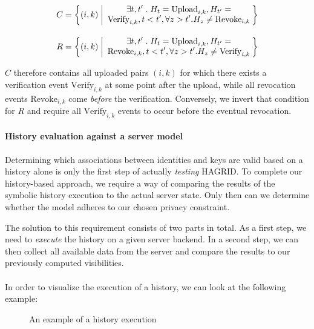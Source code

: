 \begin{equation}
    \label{eq:states}
    \begin{alignedat}{2}
        C &= \biggl \{(i,k) &&\;\bigg|\; \pctext{2.4in}{\(\exists t,t'\;.\; H_t = \text{Upload}_{i,k},H_{t'} = \text{Verify}_{i,k}, t < t', \forall z > t'. H_z \neq \text{Revoke}_{i,k}\)}  \biggr \} \\[10pt]
        R &= \biggl \{(i,k) &&\;\bigg|\; \pctext{2.4in}{\(\exists t,t'\;.\; H_t = \text{Upload}_{i,k},H_{t'} = \text{Revoke}_{i,k}, t < t', \forall z > t'. H_z \neq \text{Verify}_{i,k}\)}  \biggr \}
    \end{alignedat}
\end{equation}

\(C\) therefore contains all uploaded pairs \((i,k)\) for which there exists a verification event \(\text{Verify}_{i,k}\) at some point after the upload, while all revocation events \(\text{Revoke}_{i,k}\) come \emph{before} the verification. Conversely, we invert that condition for \(R\) and require all \(\text{Verify}_{i,k}\) events to occur before the eventual revocation.


\paragraph{History evaluation against a server model}
Determining which associations between identities and keys are valid based on a history alone is only the first step of actually \emph{testing} HAGRID. To complete our history-based approach, we require a way of comparing the results of the symbolic history execution to the actual server state. Only then can we determine whether the model adheres to our chosen privacy constraint.

The solution to this requirement consists of two parts in total. As a first step, we need to \emph{execute} the history on a given server backend. In a second step, we can then collect all available data from the server and compare the results to our previously computed visibilities. 
\\ \\
In order to visualize the execution of a history, we can look at the following example: 
\begin{figure}[H]
    \label{fig:history}
    \centering
    \caption{An example of a history execution}
\end{figure}

